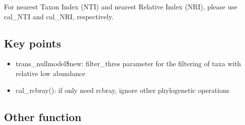 \documentclass[
]{book}
\newenvironment{Shaded}{\begin{snugshade}}{\end{snugshade}}
\newcommand{\AttributeTok}[1]{\textcolor[rgb]{0.77,0.63,0.00}{#1}}
\newcommand{\CommentTok}[1]{\textcolor[rgb]{0.56,0.35,0.01}{\textit{#1}}}
\newcommand{\ConstantTok}[1]{\textcolor[rgb]{0.00,0.00,0.00}{#1}}
\newcommand{\DecValTok}[1]{\textcolor[rgb]{0.00,0.00,0.81}{#1}}
\newcommand{\FunctionTok}[1]{\textcolor[rgb]{0.00,0.00,0.00}{#1}}
\newcommand{\NormalTok}[1]{#1}
\newcommand{\SpecialCharTok}[1]{\textcolor[rgb]{0.00,0.00,0.00}{#1}}
\newcommand{\StringTok}[1]{\textcolor[rgb]{0.31,0.60,0.02}{#1}}
\providecommand{\tightlist}{%
  \setlength{\itemsep}{0pt}\setlength{\parskip}{0pt}}
\begin{document}
\begin{Shaded}
\end{Shaded}

For nearest Taxon Index (NTI) and nearest Relative Index (NRI), please use cal\_NTI and cal\_NRI, respectively.

\begin{Shaded}
\end{Shaded}

\hypertarget{key-points-7}{%
\subsection{Key points}\label{key-points-7}}

\begin{itemize}
\tightlist
\item
  trans\_nullmodel\$new: filter\_thres parameter for the filtering of taxa with relative low abundance
\item
  cal\_rcbray(): if only need rcbray, ignore other phylogenetic operations
\end{itemize}

\hypertarget{other-function}{%
\subsection{Other function}\label{other-function}}
\end{document}

